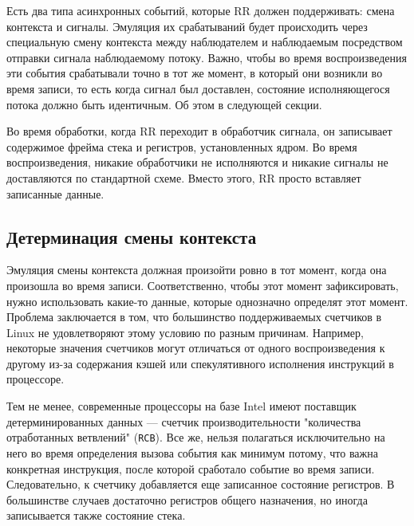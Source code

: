 Есть два типа асинхронных событий, которые RR должен поддерживать: смена контекста и сигналы.
Эмуляция их срабатываний будет происходить через специальную смену контекста между наблюдателем и наблюдаемым посредством отправки 
сигнала наблюдаемому потоку. Важно, чтобы во время воспроизведения эти события срабатывали точно в тот же момент, 
в который они возникли во время записи, то есть когда сигнал был доставлен, состояние исполняющегося потока должно быть идентичным.
Об этом в следующей секции.

Во время обработки, когда RR переходит в обработчик сигнала, он записывает содержимое фрейма стека и регистров, установленных ядром. 
Во время воспроизведения, никакие обработчики не исполняются и никакие сигналы не доставляются по стандартной схеме. 
Вместо этого, RR просто вставляет записанные данные.

\subsection{Детерминация смены контекста}

Эмуляция смены контекста должная произойти ровно в тот момент, когда она произошла во время записи.
Соответственно, чтобы этот момент зафиксировать, 
нужно использовать какие-то данные, которые однозначно определят этот момент. 
Проблема заключается в том, что большинство поддерживаемых счетчиков в Linux 
не удовлетворяют этому условию по разным причинам. 
Например, некоторые значения счетчиков могут отличаться от одного воспроизведения к другому 
из-за содержания кэшей или спекулятивного исполнения инструкций в процессоре.

Тем не менее, современные процессоры на базе Intel имеют поставщик детерминированных данных — счетчик производительности 
"количества отработанных ветвлений" (\texttt{RCB}). 
Все же, нельзя полагаться исключительно на него во время определения вызова события как 
минимум потому, что важна конкретная инструкция, после которой сработало событие во время записи. 
Следовательно, к счетчику добавляется еще 
записанное состояние регистров. 
В большинстве случаев достаточно регистров общего назначения, но иногда записывается также состояние стека.
